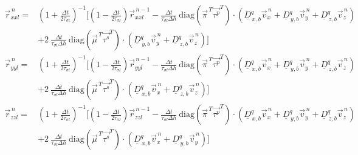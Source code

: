\documentclass[pdftex,a4paper,parskip,listof=totoc,bibliography=totoc,onehalfspacing,12pt]{scrreprt}
\begin{document}
\begin{align*}
	\vec{r}_{xxl}^{\,n} =& \left( 1+\frac{\Delta t}{2 \tau_{\sigma l}} \right)^{-1} \Bigg[ \left( 1-\frac{\Delta t}{2 \tau_{\sigma l}} \right) \vec{r}_{xxl}^{\,n-1} - \frac{\Delta t}{\tau_{\sigma l} \Delta h }~ \mathrm{diag} \left( \vec{\pi}^{\,T} \vec{\tau^p}^{T} \right) \cdot \left( \underline{D}_{\,x,b}^q \vec{v}_x^{\,n} +\underline{D}_{\,y,b}^q \vec{v}_y^{\,n} + \underline{D}_{\,z,b}^q \vec{v}_z^{\,n} \right) \\
	&+ 2~ \frac{\Delta t}{\tau_{\sigma l} \Delta h} ~\mathrm{diag} \left( \vec{\mu}^{\,T} \vec{\tau^s}^{T} \right) \cdot \left( \underline{D}_{\,y,b}^q \vec{v}_y^{\,n} + \underline{D}_{\,z,b}^q \vec{v}_z^{\,n} \right) \Bigg]\\
	\vec{r}_{yyl}^{\,n} =& \left( 1+\frac{\Delta t}{2 \tau_{\sigma l}} \right)^{-1} \Bigg[ \left( 1-\frac{\Delta t}{2 \tau_{\sigma l}} \right) \vec{r}_{yyl}^{\,n-1} - \frac{\Delta t}{\tau_{\sigma l} \Delta h }~ \mathrm{diag} \left( \vec{\pi}^{\,T} \vec{\tau^p}^{T} \right) \cdot \left( \underline{D}_{\,x,b}^q \vec{v}_x^{\,n} +\underline{D}_{\,y,b}^q \vec{v}_y^{\,n} + \underline{D}_{\,z,b}^q \vec{v}_z^{\,n} \right) \\
	&+ 2~ \frac{\Delta t}{\tau_{\sigma l} \Delta h} ~\mathrm{diag} \left( \vec{\mu}^{\,T} \vec{\tau^s}^{T} \right) \cdot \left( \underline{D}_{\,x,b}^q \vec{v}_x^{\,n} + \underline{D}_{\,z,b}^q \vec{v}_z^{\,n} \right) \Bigg]\\
	\vec{r}_{zzl}^{\,n} =& \left( 1+\frac{\Delta t}{2 \tau_{\sigma l}} \right)^{-1} \Bigg[ \left( 1-\frac{\Delta t}{2 \tau_{\sigma l}} \right) \vec{r}_{zzl}^{\,n-1} - \frac{\Delta t}{\tau_{\sigma l} \Delta h }~ \mathrm{diag} \left( \vec{\pi}^{\,T} \vec{\tau^p}^{T} \right) \cdot \left( \underline{D}_{\,x,b}^q \vec{v}_x^{\,n} +\underline{D}_{\,y,b}^q \vec{v}_y^{\,n} + \underline{D}_{\,z,b}^q \vec{v}_z^{\,n} \right) \\
	&+ 2~ \frac{\Delta t}{\tau_{\sigma l} \Delta h} ~\mathrm{diag} \left( \vec{\mu}^{\,T} \vec{\tau^s}^{T} \right) \cdot \left( \underline{D}_{\,x,b}^q \vec{v}_x^{\,n} + \underline{D}_{\,y,b}^q \vec{v}_y^{\,n} \right) \Bigg]\\
\end{align*}
\end{document}
